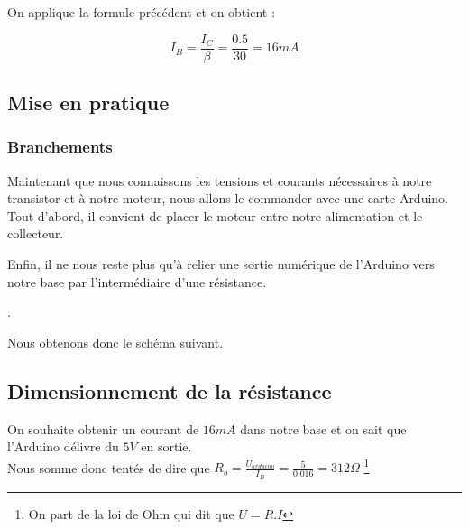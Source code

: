 

\begin{reponse}
  On applique la formule précédent et on obtient : 

  $$  I_{B} = \frac{I_{C}}{\beta} = \frac{0.5}{30} = 16 mA $$

  \end{reponse}

 

\subsection{Mise en pratique}

\subsubsection{Branchements}

    Maintenant que nous connaissons les tensions et courants nécessaires à notre transistor et à notre moteur, nous allons le commander avec une carte Arduino. \\

    Tout d'abord, il convient de placer le moteur entre notre alimentation et le collecteur.\\
    


    Enfin, il ne nous reste plus qu'à relier une sortie numérique de l'Arduino vers notre base par l'intermédiaire d'une résistance.

    .

    Nous obtenons donc le schéma suivant.


    \subsection{Dimensionnement de la résistance}

    On souhaite obtenir un courant de $16 mA$ dans notre base et on sait que l'Arduino délivre du $5V$ en sortie.\\

    Nous somme donc tentés de dire que $R_b = \frac{U_{arduino}}{ I_{B}} = \frac{5}{0.016} = 312 \Omega$ \footnote{On part de la loi de Ohm qui dit que $U=R.I$}\\


